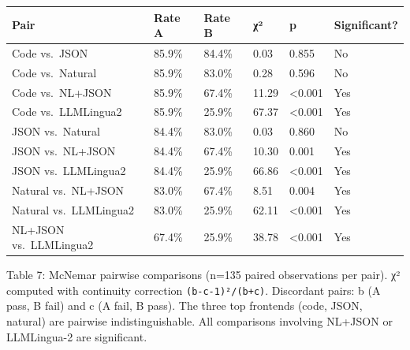 {\def\LTcaptype{none} %

\begin{longtable}[]{@{}llllll@{}}

\toprule\noalign{}

Pair & Rate A & Rate B & χ² & p & Significant? \\

\midrule\noalign{}

\endhead

\bottomrule\noalign{}

\endlastfoot

Code vs.~JSON & 85.9\% & 84.4\% & 0.03 & 0.855 & No \\

Code vs.~Natural & 85.9\% & 83.0\% & 0.28 & 0.596 & No \\

Code vs.~NL+JSON & 85.9\% & 67.4\% & 11.29 & \textless0.001 & Yes \\

Code vs.~LLMLingua2 & 85.9\% & 25.9\% & 67.37 & \textless0.001 & Yes \\

JSON vs.~Natural & 84.4\% & 83.0\% & 0.03 & 0.860 & No \\

JSON vs.~NL+JSON & 84.4\% & 67.4\% & 10.30 & 0.001 & Yes \\

JSON vs.~LLMLingua2 & 84.4\% & 25.9\% & 66.86 & \textless0.001 & Yes \\

Natural vs.~NL+JSON & 83.0\% & 67.4\% & 8.51 & 0.004 & Yes \\

Natural vs.~LLMLingua2 & 83.0\% & 25.9\% & 62.11 & \textless0.001 & Yes \\

NL+JSON vs.~LLMLingua2 & 67.4\% & 25.9\% & 38.78 & \textless0.001 & Yes \\

\end{longtable}

}



Table 7: McNemar pairwise comparisons (n=135 paired observations per pair). χ² computed with continuity correction \texttt{(\textbar{}b-c\textbar{}-1)²/(b+c)}. Discordant pairs: b (A pass, B fail) and c (A fail, B pass). The three top frontends (code, JSON, natural) are pairwise indistinguishable. All comparisons involving NL+JSON or LLMLingua-2 are significant.



